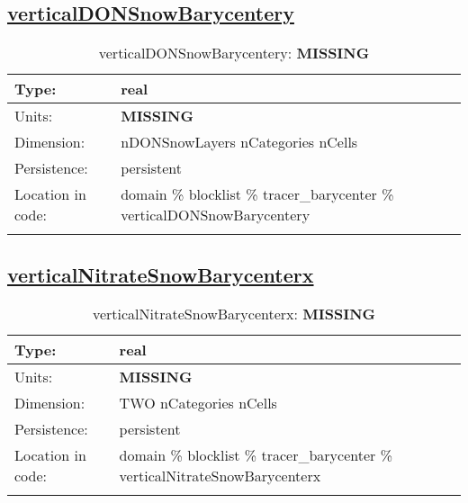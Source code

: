 \subsection[verticalDONSnowBarycentery]{\hyperref[sec:var_tab_tracer_barycenter]{verticalDONSnowBarycentery}}
\label{subsec:var_sec_tracer_barycenter_verticalDONSnowBarycentery}
\begin{center}
\begin{longtable}{| p{2.0in} | p{4.0in} |}
        \hline 
        Type: & real \\
        \hline 
        Units: & {\bf \color{red} MISSING} \\
        \hline 
        Dimension: & nDONSnowLayers nCategories nCells \\
        \hline 
        Persistence: & persistent \\
        \hline 
         Location in code: & domain \% blocklist \% tracer\_barycenter \% verticalDONSnowBarycentery \\
         \hline 
    \caption{verticalDONSnowBarycentery: {\bf \color{red} MISSING}}
\end{longtable}
\end{center}
\subsection[verticalNitrateSnowBarycenterx]{\hyperref[sec:var_tab_tracer_barycenter]{verticalNitrateSnowBarycenterx}}
\label{subsec:var_sec_tracer_barycenter_verticalNitrateSnowBarycenterx}
\begin{center}
\begin{longtable}{| p{2.0in} | p{4.0in} |}
        \hline 
        Type: & real \\
        \hline 
        Units: & {\bf \color{red} MISSING} \\
        \hline 
        Dimension: & TWO nCategories nCells \\
        \hline 
        Persistence: & persistent \\
        \hline 
         Location in code: & domain \% blocklist \% tracer\_barycenter \% verticalNitrateSnowBarycenterx \\
         \hline 
    \caption{verticalNitrateSnowBarycenterx: {\bf \color{red} MISSING}}
\end{longtable}
\end{center}
